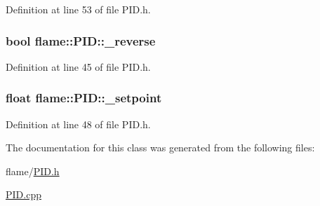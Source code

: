 Definition at line 53 of file P\-I\-D.\-h.

\hypertarget{classflame_1_1_p_i_d_a73b97134241f384d3bd404fc946febe7}{
\subsubsection[{\-\_\-reverse}]{\setlength{\rightskip}{0pt plus 5cm}bool flame\-::\-P\-I\-D\-::\-\_\-reverse\hspace{0.3cm}{\ttfamily [protected]}}}\label{classflame_1_1_p_i_d_a73b97134241f384d3bd404fc946febe7}


Definition at line 45 of file P\-I\-D.\-h.

\hypertarget{classflame_1_1_p_i_d_ac5fe71cf9d08a3f802bab87ad6e60832}{
\subsubsection[{\-\_\-setpoint}]{\setlength{\rightskip}{0pt plus 5cm}float flame\-::\-P\-I\-D\-::\-\_\-setpoint\hspace{0.3cm}{\ttfamily [protected]}}}\label{classflame_1_1_p_i_d_ac5fe71cf9d08a3f802bab87ad6e60832}


Definition at line 48 of file P\-I\-D.\-h.



The documentation for this class was generated from the following files\-:\begin{DoxyCompactItemize}
\item 
flame/\hyperlink{_p_i_d_8h}{P\-I\-D.\-h}\item 
\hyperlink{_p_i_d_8cpp}{P\-I\-D.\-cpp}\end{DoxyCompactItemize}
